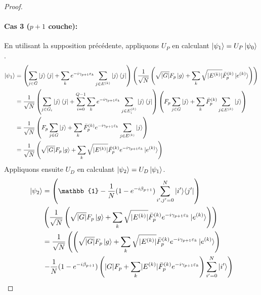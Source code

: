 \begin{proof}
\paragraph{Cas 3 ($p+1$ couche):} En utilisant la supposition précédente, appliquons $U_{P}$ en calculant $\ket{\psi_{1}} = U_{P} \ket{\psi_{0}}$.
\begin{equation}
\begin{aligned}
\ket{\psi_{1}} & = \left(\sum_{j \in G} \ket{j}\bra{j} + \sum_{k} e^{-i \gamma_{p+1} \varepsilon_{k}} \sum_{j \in E^{(k)}} \ket{j}\bra{j} \right) \left( \frac{1}{\sqrt{ N }} \left( \sqrt{ \lvert G \rvert } F_{p} \ket{g} + \sum_{k} \sqrt{ \lvert E^{(k)} \rvert } \bar{F}^{(k)}_{p} \ket{e^{(k)}} \right) \right) \\
& = \frac{1}{\sqrt{ N }} \left( \sum_{j \in G_{i}} \ket{j}\bra{j} + \sum_{i=0}^{Q-1} \sum_{k} e^{-i \gamma_{p+1} \varepsilon_{k}} \sum_{j \in E^{(k)}_{i}} \ket{j}\bra{j} \right) \left( F_{p} \sum_{j \in G} \ket{j} + \sum_{k} \bar{F}^{(k)}_{p} \sum_{j \in E^{(k)}}\ket{j} \right) \\
& = \frac{1}{\sqrt{ N }} \left( F_{p} \sum_{j \in G}\ket{j}  + \sum_{k} \bar{F}^{(k)}_{p} e^{-i \gamma_{p+1} \varepsilon_{k}} \sum_{j \in E^{(k)}} \ket{j} \right) \\
& = \frac{1}{\sqrt{ N }} \left( \sqrt{ \lvert G \rvert  } F_{p} \ket{g} + \sum_{k} \sqrt{ \lvert E^{(k)} \rvert  }\bar{F}^{(k)}_{p} e^{-i \gamma_{p+1} \varepsilon_{k}} \ket{e^{(k)}} \right) \\
\end{aligned}
\end{equation}
Appliquons ensuite $U_{D}$ en calculant $\ket{\psi_{2}}=U_{D}\ket{\psi_{1}}$.
\begin{equation}
\begin{aligned}
\ket{\psi_{2}} &= \left( \mathbb{1} - \frac{1}{N} (1 - e^{-i\beta_{p+1}}) \sum_{i',j'=0}^{N} \ket{i'}\!\bra{j'} \right) \\
&\left( \frac{1}{\sqrt{ N }} \left( \sqrt{ \lvert G \rvert  } F_{p} \ket{g} + \sum_{k} \sqrt{ \lvert E^{(k)} \rvert  }\bar{F}^{(k)}_{p} e^{-i \gamma_{p+1} \varepsilon_{k}} \ket{e^{(k)}} \right) \right) \\
&= \frac{1}{\sqrt{ N }} \left( \left( \sqrt{ \lvert G \rvert  } F_{p} \ket{g} + \sum_{k} \sqrt{ \lvert E^{(k)} \rvert  }\bar{F}^{(k)}_{p} e^{-i \gamma_{p+1} \varepsilon_{k}} \ket{e^{(k)}} \right) \right. \\
& \left. - \frac{1}{N} (1 - e^{-i\beta_{p+1}}) \left(  \lvert G \rvert F_{p} + \sum_{k} \lvert E^{(k)} \rvert \bar{F}^{(k)}_{p} e^{-i \gamma_{p+1} \varepsilon_{k}}\right) \sum_{i'=0}^{N} \ket{i'} \right) \\

\end{aligned}
\end{equation}
\end{proof}
